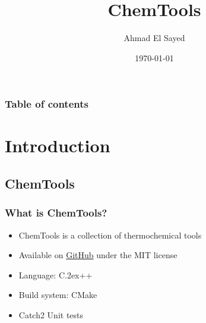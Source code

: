 \documentclass{beamer}
\def\Cplusplus{{C\raise.2ex\hbox{++}}}
\begin{document}
\title{ChemTools} 
\author{Ahmad El Sayed} 
\date{\today} 

\begin{frame}
  \titlepage
\end{frame}

\begin{frame}
\frametitle{Table of contents}
\tableofcontents
\end{frame}

\section{Introduction} 
\subsection{ChemTools}
\begin{frame}
\frametitle{What is ChemTools?}
\begin{itemize}
  \item ChemTools is a collection of thermochemical tools
  \item Available on \href{https://github.com/ahmades/ChemTools}{GitHub} under the MIT license
  \item Language: \Cplusplus
  \item Build system: CMake
  \item Catch2 Unit tests
\end{itemize} 
\end{frame}
\end{document}
